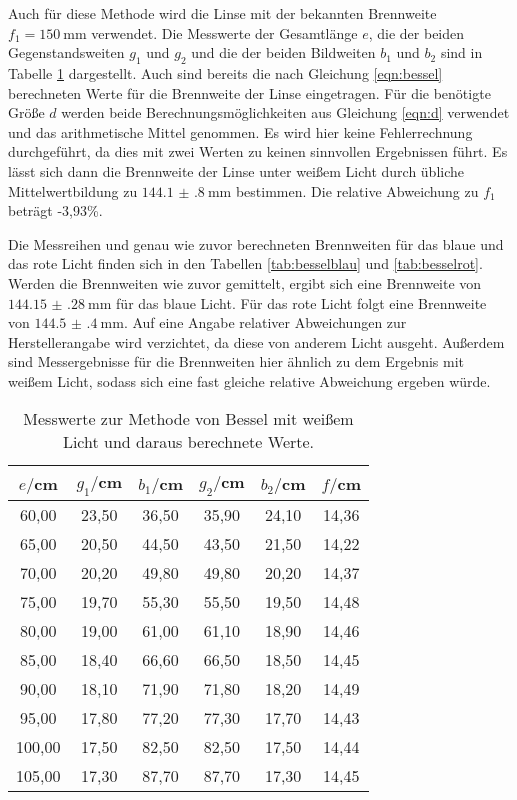 Auch für diese Methode wird die Linse mit der bekannten Brennweite $f_1 = \SI{150}{\milli\meter}$
verwendet. Die Messwerte der Gesamtlänge $e$, die der beiden Gegenstandsweiten $g_1$ und $g_2$
und die der beiden Bildweiten $b_1$ und $b_2$ sind in Tabelle \ref{tab:bessel} dargestellt. Auch sind
bereits die nach Gleichung \eqref{eqn:bessel} berechneten Werte für die Brennweite
der Linse eingetragen. Für die benötigte Größe $d$ werden beide Berechnungsmöglichkeiten
aus Gleichung \eqref{eqn:d} verwendet und das arithmetische Mittel genommen. Es wird hier keine
Fehlerrechnung durchgeführt, da dies mit zwei Werten zu keinen sinnvollen Ergebnissen
führt. Es lässt sich dann die Brennweite der Linse unter weißem Licht durch
übliche Mittelwertbildung zu $\SI{144.1(8)}{\milli\meter}$ bestimmen. Die
relative Abweichung zu $f_1$ beträgt -3,93\%.

Die Messreihen und genau wie zuvor berechneten Brennweiten für das blaue und das
rote Licht finden sich in den Tabellen \ref{tab:besselblau} und \ref{tab:besselrot}.
Werden die Brennweiten wie zuvor gemittelt,
ergibt sich eine Brennweite von $\SI{144.15(28)}{\milli\meter}$ für das blaue Licht.
Für das rote Licht folgt eine Brennweite von $\SI{144.5(4)}{\milli\meter}$.
Auf eine Angabe relativer Abweichungen zur Herstellerangabe wird verzichtet, da
diese von anderem Licht ausgeht. Außerdem sind Messergebnisse für die Brennweiten hier
ähnlich zu dem Ergebnis mit weißem Licht, sodass sich eine fast gleiche relative Abweichung
ergeben würde.

\begin{table}[htp]
	\begin{center}
    \caption{Messwerte zur Methode von Bessel mit weißem Licht und daraus berechnete Werte.}
    \label{tab:bessel}
		\begin{tabular}{cccccc}
		\toprule
			{$e/$cm} & {$g_1/$cm} & {$b_1/$cm} & {$g_2/$cm} & {$b_2/$cm} & {$f/$cm}\\
			\midrule
			60,00 & 23,50 & 36,50 & 35,90 & 24,10 & 14,36\\
			65,00 & 20,50 & 44,50 & 43,50 & 21,50 & 14,22\\
			70,00 & 20,20 & 49,80 & 49,80 & 20,20 & 14,37\\
			75,00 & 19,70 & 55,30 & 55,50 & 19,50 & 14,48\\
			80,00 & 19,00 & 61,00 & 61,10 & 18,90 & 14,46\\
			85,00 & 18,40 & 66,60 & 66,50 & 18,50 & 14,45\\
			90,00 & 18,10 & 71,90 & 71,80 & 18,20 & 14,49\\
			95,00 & 17,80 & 77,20 & 77,30 & 17,70 & 14,43\\
			100,00 & 17,50 & 82,50 & 82,50 & 17,50 & 14,44\\
			105,00 & 17,30 & 87,70 & 87,70 & 17,30 & 14,45\\
		\bottomrule
		\end{tabular}
	\end{center}
\end{table}

